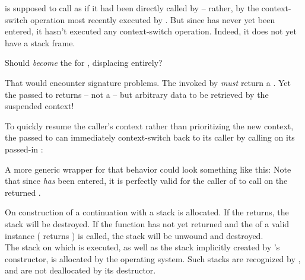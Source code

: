 \resumewith is supposed to call  as if it had been
directly called by  -- rather, by the context-switch
operation most recently executed by . But
since  has never yet been entered, it hasn't executed
any context-switch operation. Indeed, it does not yet have a stack frame.

Should  \emph{become} the \entryfn
for , displacing  entirely?

That would encounter signature problems. The \entryfn invoked
by \callcc \emph{must} return a \cont. Yet the  passed to \resumewith
returns -- not a \cont -- but arbitrary data to be retrieved by the suspended
context!

To quickly resume the caller's context rather than prioritizing the new
context, the \entryfn passed to \callcc can immediately context-switch back
to its caller by calling \resume on its passed-in \cont:

A more generic wrapper for that behavior could look something like this:
Note that since  \emph{has} been entered, it
is perfectly valid for the caller of  to
call \resumewith on the returned \cont.

\label{subsec:destruction}
On construction of a continuation with \callcc a stack is allocated. If the
\entryfn returns, the stack will be destroyed. If the function has not
yet returned and the  of a valid \cont instance (\opbool
returns ) is called, the stack will be unwound and destroyed.\\
The stack on which  is executed, as well as the stack implicitly
created by 's constructor, is allocated by the operating
system. Such stacks are recognized by \cont, and are not deallocated by its
destructor.


